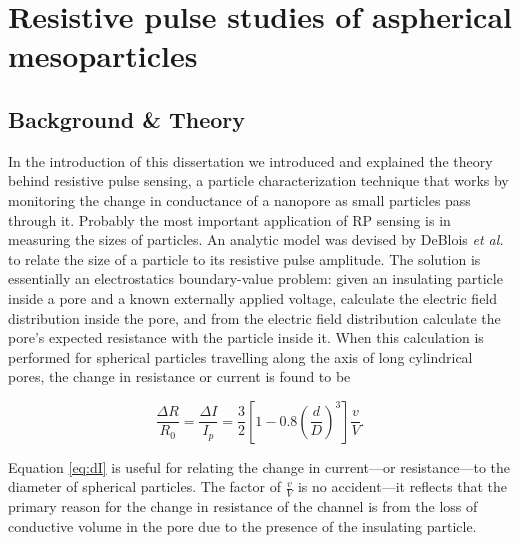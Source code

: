 \graphicspath{{../images/ch3/}}	%


\chapter{Resistive pulse studies of aspherical mesoparticles}
\label{chap:rods}
	

	\section{Background \& Theory}
		In the introduction of this dissertation we introduced and explained the theory behind resistive pulse sensing, a particle characterization technique that works by monitoring the change in conductance of a nanopore as small particles pass through it. Probably the most important application of RP sensing is in measuring the sizes of particles. An analytic model was devised by DeBlois \emph{et al.} to relate the size of a particle to its resistive pulse amplitude. The solution is essentially an electrostatics boundary-value problem: given an insulating particle inside a pore and a known externally applied voltage, calculate the electric field distribution inside the pore, and from the electric field distribution calculate the pore's expected resistance with the particle inside it. When this calculation is performed for spherical particles travelling along the axis of long cylindrical pores, the change in resistance or current is found to be
		
		\begin{equation}\label{eq:dI}
			\frac{\Delta R}{R_{0}}=\frac{\Delta I}{I_{p}}=\frac{3}{2}\left[1-0.8\left(\frac{d}{D}\right)^{3}\right]\frac{v}{V}.
		\end{equation}
		
		
		

		
		
		
		Equation \ref{eq:dI} is useful for relating the change in current---or resistance---to the diameter of spherical particles. The factor of $\frac{v}{V}$ is no accident---it reflects that the primary reason for the change in resistance of the channel is from the loss of conductive volume in the pore due to the presence of the insulating particle. 
		
